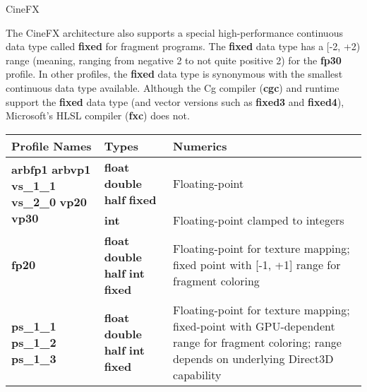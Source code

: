 \documentclass[../main.tex]{subfiles}
\begin{document}
\begin{framed}
CineFX

The CineFX architecture also supports a special high-performance continuous data type called \textbf{fixed} for fragment programs. The \textbf{fixed} data type has a [-2, +2) range (meaning, ranging from negative 2 to not quite positive 2) for the \textbf{fp30} profile. In other profiles, the \textbf{fixed} data type is synonymous with the smallest continuous data type available. Although the Cg compiler (\textbf{cgc}) and runtime support the \textbf{fixed} data type (and vector versions such as \textbf{fixed3} and \textbf{fixed4}), Microsoft's HLSL compiler (\textbf{fxc}) does not.
\end{framed}

\begin{table}
\centering
\begin{tabular}{ p{2cm} p{2cm} p{7cm}  } 

Profile Names & Types & Numerics \\
\hline

\multirow{2}{4em}{\textbf{arbfp1} \newline \textbf{arbvp1} \newline \textbf{vs_1_1} \newline \textbf{vs_2_0} \newline \textbf{vp20} \newline \textbf{vp30} } & \textbf{float} \newline \textbf{double} \newline \textbf{half} \newline \textbf{fixed} & Floating-point \\
\cline{2-3}
& \textbf{int} \newline & Floating-point clamped to integers \\
\hline

\textbf{fp20} & \textbf{float} \newline \textbf{double} \newline \textbf{half} \newline \textbf{int} \newline \textbf{fixed} & Floating-point for texture mapping; fixed point with [-1, +1] range for fragment coloring \\
\hline

\textbf{ps_1_1} \newline \textbf{ps_1_2} \newline \textbf{ps_1_3} & \textbf{float} \newline \textbf{double} \newline \textbf{half} \newline \textbf{int} \newline \textbf{fixed} & Floating-point for texture mapping; fixed-point with GPU-dependent range for fragment coloring; range depends on underlying Direct3D capability \\
\hline


\end{tabular}
\end{table}
\end{document}
